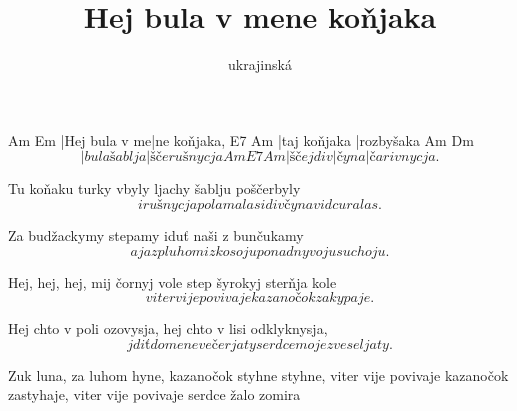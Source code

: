 \documentclass{song}
\title{Hej bula v mene koňjaka}
\author{ukrajinská}
\begin{document}
\strophe
Am            Em
|Hej bula v me|ne koňjaka,
E7           Am
|taj koňjaka |rozbyšaka
   Am           Dm
\[ |bula šablja |šče rušnycja
Am        E7    Am
|šče j div|čyna |čarivnycja. \]
\endstrophe

\strophe*
Tu koňaku turky vbyly
ljachy šablju poščerbyly
\[ i rušnycja polamalas
i divčyna vidcuralas. \]
\endstrophe

\strophe*
Za budžackymy stepamy
iduť naši z bunčukamy
\[ a ja z pluhom i z kosoju
ponad nyvoju suchoju. \]
\endstrophe

\strophe*
Hej, hej, hej, mij čornyj vole
step šyrokyj sterňja kole
\[ viter vije povivaje
kazanočok zakypaje. \]
\endstrophe

\strophe*
Hej chto v poli ozovysja,
hej chto v lisi odklyknysja,
\[ jdiť do mene večerjaty
serdce moje zveseljaty. \]
\endstrophe

\strophe*
Zuk luna, za luhom hyne,
kazanočok styhne styhne,
viter vije povivaje
kazanočok zastyhaje,
viter vije povivaje
serdce žalo zomira
\endstrophe
\end{document}
